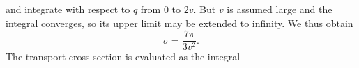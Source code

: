 and integrate with respect to $q$ from $0$ to $2v$. But $v$ is assumed large and the integral converges, so its upper limit may be extended to infinity. We thus obtain
\[
 \sigma=\frac{7\pi}{3v^2}.
\]
The transport cross section is evaluated as the integral

